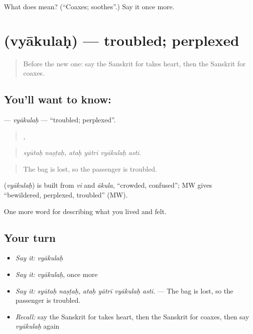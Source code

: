 \begin{tcolorbox}[breakable,colback=teal!4,colframe=teal!35!black,title={Before you move on}]
What does  mean? (\textquotedblleft{}Coaxes; soothes\textquotedblright{}.) Say it once more.
\end{tcolorbox}
\section[\texorpdfstring{\sk{व्याकुलः} (vyākulaḥ)}{व्याकुलः (vyākulaḥ)}]{ (vyākulaḥ) — troubled; perplexed}

\label{lesson:SA-C451-vyakulah}



\begin{quote}
Before the new one: say the Sanskrit for takes heart, then the Sanskrit for coaxes.
\end{quote}

\subsection*{You'll want to know: }
\textbf{} — \emph{vyākulaḥ} — \textquotedblleft{}troubled; perplexed\textquotedblright{}.

\begin{quote}
 ,    
\end{quote}

\begin{quote}
\emph{syūtaḥ naṣṭaḥ, ataḥ yātrī vyākulaḥ asti.}
\end{quote}

\begin{quote}
The bag is lost, so the passenger is troubled.
\end{quote}

\begin{cousinweb}
\textbf{} (\emph{vyākulaḥ}) is built from \emph{vi} and \emph{ākula}, \textquotedblleft{}crowded, confused\textquotedblright{}; MW gives \textquotedblleft{}bewildered, perplexed, troubled\textquotedblright{} (MW).
\end{cousinweb}

\begin{grammarlens}[title={What you've built}]
One more word for describing what you lived and felt.
\end{grammarlens}

\subsection*{Your turn}
\begin{itemize}
\raggedright
  \item \emph{Say it:} \emph{vyākulaḥ}
  \item \emph{Say it:} \emph{vyākulaḥ}, once more
  \item \emph{Say it:} \emph{syūtaḥ naṣṭaḥ, ataḥ yātrī vyākulaḥ asti.} — The bag is lost, so the passenger is troubled.
  \item \emph{Recall:} say the Sanskrit for takes heart, then the Sanskrit for coaxes, then say \emph{vyākulaḥ} again
\end{itemize}

